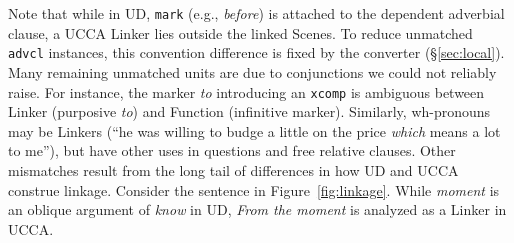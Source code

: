\documentclass[11pt,a4paper,table]{article}
\begin{document}
Note that while in UD, \texttt{mark} (e.g., \textit{before})
is attached to the dependent adverbial clause,
a UCCA Linker lies outside the linked Scenes.
To reduce unmatched \texttt{advcl} instances,
this convention difference is fixed by the converter
(\S\ref{sec:local}).
Many remaining unmatched units are due to conjunctions we could not reliably raise.
For instance, the marker \textit{to} introducing an \texttt{xcomp} is ambiguous between Linker
(purposive \textit{to}) and Function (infinitive marker).
Similarly, wh-pronouns may be Linkers
(``he was willing to budge a little on the price {\it which} means a lot to me''),
but have other uses in questions and free relative clauses.
Other mismatches result from the long tail of differences in how UD and UCCA construe linkage.
Consider the sentence in Figure~\ref{fig:linkage}.
While \textit{moment} is an oblique argument of \textit{know} in UD,
\textit{From the moment} is analyzed as a Linker in UCCA.
\end{document}
